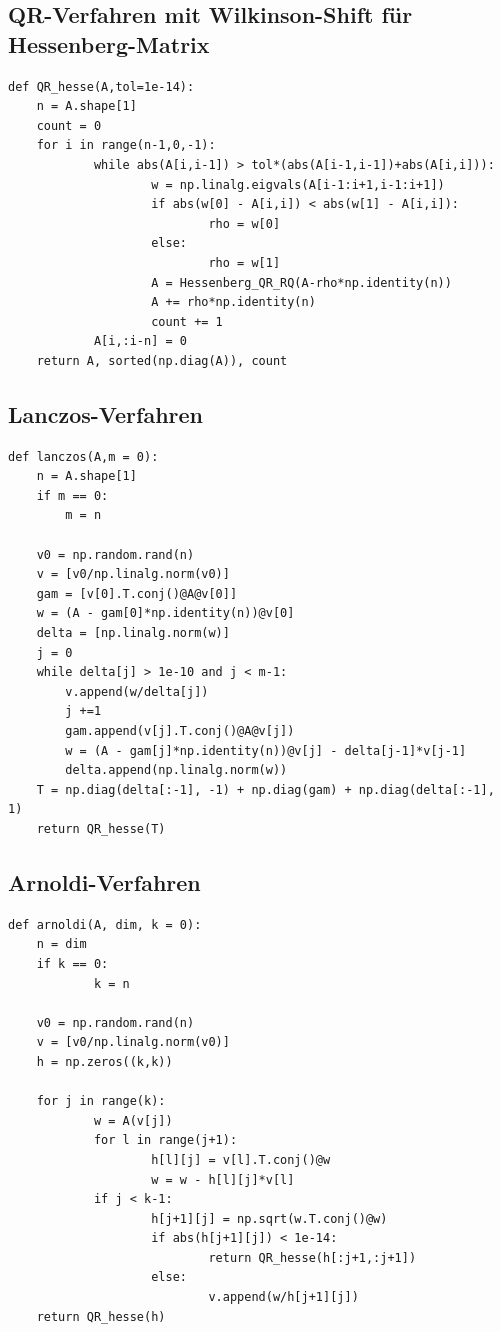 \documentclass{article}
\theoremstyle{plain}
\begin{document}
\subsection*{QR-Verfahren mit Wilkinson-Shift für Hessenberg-Matrix}


\begin{lstlisting}
def QR_hesse(A,tol=1e-14):
	n = A.shape[1]
	count = 0
	for i in range(n-1,0,-1):
			while abs(A[i,i-1]) > tol*(abs(A[i-1,i-1])+abs(A[i,i])):
					w = np.linalg.eigvals(A[i-1:i+1,i-1:i+1])
					if abs(w[0] - A[i,i]) < abs(w[1] - A[i,i]):
							rho = w[0]
					else:
							rho = w[1]
					A = Hessenberg_QR_RQ(A-rho*np.identity(n))
					A += rho*np.identity(n)
					count += 1
			A[i,:i-n] = 0
	return A, sorted(np.diag(A)), count
\end{lstlisting}

\newpage
\subsection*{Lanczos-Verfahren}


\begin{lstlisting}
def lanczos(A,m = 0):
    n = A.shape[1]
    if m == 0:
        m = n

    v0 = np.random.rand(n)
    v = [v0/np.linalg.norm(v0)]
    gam = [v[0].T.conj()@A@v[0]]
    w = (A - gam[0]*np.identity(n))@v[0]
    delta = [np.linalg.norm(w)]
    j = 0
    while delta[j] > 1e-10 and j < m-1:
        v.append(w/delta[j])
        j +=1
        gam.append(v[j].T.conj()@A@v[j])
        w = (A - gam[j]*np.identity(n))@v[j] - delta[j-1]*v[j-1]
        delta.append(np.linalg.norm(w))
    T = np.diag(delta[:-1], -1) + np.diag(gam) + np.diag(delta[:-1], 1)
    return QR_hesse(T)
\end{lstlisting}

\subsection*{Arnoldi-Verfahren}


\begin{lstlisting}
def arnoldi(A, dim, k = 0):
	n = dim
	if k == 0:
			k = n

	v0 = np.random.rand(n)
	v = [v0/np.linalg.norm(v0)]
	h = np.zeros((k,k))

	for j in range(k):
			w = A(v[j])
			for l in range(j+1):
					h[l][j] = v[l].T.conj()@w
					w = w - h[l][j]*v[l]
			if j < k-1:
					h[j+1][j] = np.sqrt(w.T.conj()@w)
					if abs(h[j+1][j]) < 1e-14:
							return QR_hesse(h[:j+1,:j+1])
					else:
							v.append(w/h[j+1][j])
	return QR_hesse(h)
\end{lstlisting}
\newpage
\end{document}
